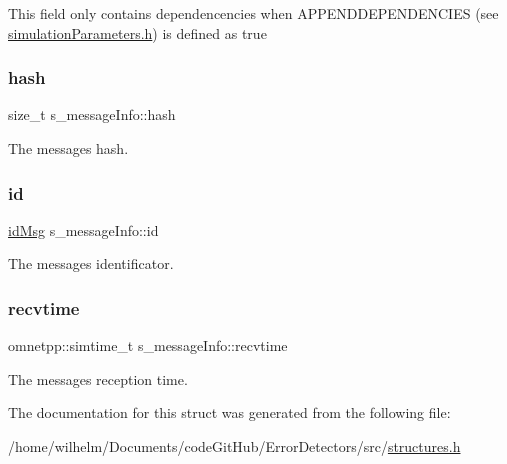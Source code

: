 This field only contains dependencencies when A\+P\+P\+E\+N\+D\+D\+E\+P\+E\+N\+D\+E\+N\+C\+I\+ES (see \hyperlink{simulation_parameters_8h}{simulation\+Parameters.\+h}) is defined as true \mbox{\label{structs__message_info_a9b627c36e814fbbd04a89bc6e827e4ff}} 
\subsubsection{\texorpdfstring{hash}{hash}}
{\footnotesize\ttfamily size\+\_\+t s\+\_\+message\+Info\+::hash}



The message\textquotesingle{}s hash. 

\mbox{\label{structs__message_info_a6c2928774199848fd25b4e8ffb7870c2}} 
\subsubsection{\texorpdfstring{id}{id}}
{\footnotesize\ttfamily \hyperlink{structures_8h_a83a1d9a070efa5341da84cfd8e28d3e5}{id\+Msg} s\+\_\+message\+Info\+::id}



The message\textquotesingle{}s identificator. 

\mbox{\label{structs__message_info_a3600b24205dc07ce06774af44976c107}} 
\subsubsection{\texorpdfstring{recvtime}{recvtime}}
{\footnotesize\ttfamily omnetpp\+::simtime\+\_\+t s\+\_\+message\+Info\+::recvtime}



The message\textquotesingle{}s reception time. 



The documentation for this struct was generated from the following file\+:\begin{DoxyCompactItemize}
\item 
/home/wilhelm/\+Documents/code\+Git\+Hub/\+Error\+Detectors/src/\hyperlink{structures_8h}{structures.\+h}\end{DoxyCompactItemize}
